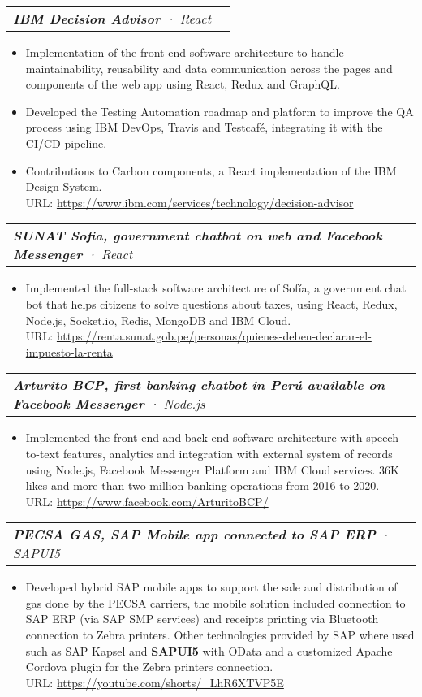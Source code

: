 \documentclass[letterpaper,11pt]{article}
\makeatletter
\newcommand{\resumeItem}[1]{
  \item\small{
    {#1 \vspace{-2pt}}
  }
}
\newcommand{\resumeSubSubheading}[2]{
    \vspace{-2pt}\item
    \begin{tabular*}{0.97\textwidth}{l@{\extracolsep{\fill}}r}
      \textit{\small#1} & \textit{\small #2} \\
    \end{tabular*}\vspace{-7pt}
}
\newcommand{\resumeItemListStart}{\begin{itemize}}
\newcommand{\resumeItemListEnd}{\end{itemize}\vspace{-5pt}}
\makeatother
\begin{document}
      \resumeSubSubheading{\textbf{IBM Decision Advisor}  · React}{}
        \resumeItemListStart
          \resumeItem{Implementation of the front-end software architecture to handle maintainability, reusability and data communication across the pages and components of the web app using React, Redux and GraphQL.}
          \resumeItem{Developed the Testing Automation roadmap and platform to improve the QA process using IBM DevOps, Travis and Testcafé, integrating it with the CI/CD pipeline.}
          \resumeItem{Contributions to Carbon components, a React implementation of the IBM Design System.
          \\[1.5pt] URL: {\href{https://www.ibm.com/services/technology/decision-advisor}{\color{blue}https://www.ibm.com/services/technology/decision-advisor}}
          }
        \resumeItemListEnd

      \resumeSubSubheading{\textbf{SUNAT Sofia, government chatbot on web and Facebook Messenger} · React}{}
        \resumeItemListStart
          \resumeItem{Implemented the full-stack software architecture of Sofía, a government chat bot that helps citizens to solve questions about taxes, using React, Redux, Node.js, Socket.io, Redis, MongoDB and IBM Cloud.
          \\[1.5pt] URL: {\href{https://renta.sunat.gob.pe/personas/quienes-deben-declarar-el-impuesto-la-renta}{\color{blue}https://renta.sunat.gob.pe/personas/quienes-deben-declarar-el-impuesto-la-renta}}
          }
        \resumeItemListEnd

      \resumeSubSubheading{\textbf{Arturito BCP, first banking chatbot in Perú available on Facebook Messenger} · Node.js}{}
        \resumeItemListStart
          \resumeItem{Implemented the front-end and back-end software architecture with speech-to-text features, analytics and integration with external system of records using Node.js, Facebook Messenger Platform and IBM Cloud services. 36K likes and more than two million banking operations from 2016 to 2020.
          \\[1.5pt] URL: {\href{https://www.facebook.com/ArturitoBCP/}{\color{blue}https://www.facebook.com/ArturitoBCP/}}
          }
        \resumeItemListEnd

      \resumeSubSubheading{\textbf{PECSA GAS, SAP Mobile app connected to SAP ERP} · SAPUI5}{}
        \resumeItemListStart
          \resumeItem{Developed hybrid SAP mobile apps to support the sale and distribution of gas done by the PECSA carriers, the mobile solution included connection to SAP ERP (via SAP SMP services) and receipts printing via Bluetooth connection to Zebra printers. Other technologies provided by SAP where used such as SAP Kapsel and \textbf{SAPUI5} with OData and a customized Apache Cordova plugin for the Zebra printers connection.
          \\[1.5pt] URL: {\href{https://youtube.com/shorts/\_LhR6XTVP5E}{\color{blue}https://youtube.com/shorts/\_LhR6XTVP5E}}}
        \resumeItemListEnd
\end{document}
